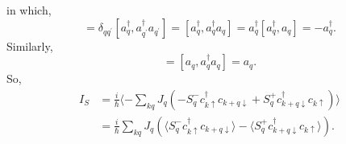 \documentclass[11pt,a4paper]{article}
\begin{document}
in which,
\begin{equation}
[a_{q}^{\dag}, \sum_{q^{\prime}} a_{q'}^{\dagger}, a_{q^{\prime}}] = \delta_{q q^{\prime}}[a_{q}^{\dagger}, a_{q^{\prime}}^{\dagger} a_{q^{\prime}}] = [a_{q}^{\dagger}, a_{q}^{\dagger} a_{q}] = a_{q}^{\dagger}[a_{q}^{\dagger}, a_{q}] = - a_{q}^{\dagger}.
\end{equation}
Similarly,
\begin{equation}
[a_{q}, \sum_{q^{\prime}} a_{q^{\prime}}^{+} a_{q^{\prime}}]=[a_{q}, a_{q}^{\dagger} a_{q}]=a_{q}.
\label{eq:1-1}
\end{equation}
So,
\begin{equation}
\begin{split}
I_{S}&=\frac{i}{\hbar}\langle -\sum_{k q} J_{q}\left(-S_{q}^{-} c_{k \uparrow}^{\dagger} c_{k+q\downarrow} + S_{q}^{+} c_{k+q\downarrow}^{\dagger} c_{k \uparrow}\right) \rangle \\
&= \frac{i}{\hbar} \sum_{k q} J_{q}\left( \langle S_{q}^{-} c_{k \uparrow}^{\dagger} c_{k+q\downarrow}\rangle - \langle S_{q}^{+} c_{k+q\downarrow}^{\dagger} c_{k \uparrow}\rangle \right).
\end{split}
\end{equation}
\end{document}
